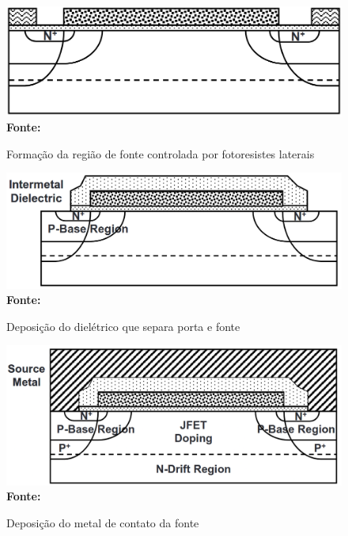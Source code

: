 \begin{frame}

    \begin{figure}[!htbp]
        \centering
        \caption{Formação da região de fonte controlada por fotoresistes laterais}
        \includegraphics[scale=0.2]{imagens/dmos_fab_d.png}
        \\\small{\textbf{Fonte:} \cite{baliga2010fundamentals}}%
    \end{figure}

\end{frame}

\begin{frame}

    \begin{figure}[!htbp]
        \centering
        \caption{Deposição do dielétrico que separa porta e fonte}
        \includegraphics[scale=0.2]{imagens/dmos_fab_e.png}
        \\\small{\textbf{Fonte:} \cite{baliga2010fundamentals}}%
    \end{figure}

\end{frame}

\begin{frame}

    \begin{figure}[!htbp]
        \centering
        \caption{Deposição do metal de contato da fonte}
        \includegraphics[scale=0.2]{imagens/dmos_fab_f.png}
        \\\small{\textbf{Fonte:} \cite{baliga2010fundamentals}}%
    \end{figure}

\end{frame}
